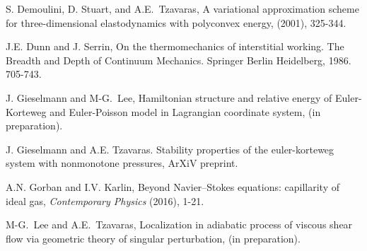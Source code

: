 \documentclass[a4paper,11pt]{article}
\begin{document}
\begin{thebibliography}{10}
S. Demoulini, D. Stuart, and A.E.~Tzavaras,
\newblock A variational approximation scheme for three-dimensional
  elastodynamics with polyconvex energy,
 (2001), 325-344.

J.E. Dunn and J. Serrin, On the thermomechanics of interstitial working. The Breadth and Depth of Continuum Mechanics. Springer Berlin Heidelberg, 1986. 705-743.


{\sc J. Gieselmann and M-G.~Lee},
Hamiltonian structure and relative energy of Euler-Korteweg and Euler-Poisson model in Lagrangian coordinate system, (in preparation).

J. Gieselmann and A.E. Tzavaras.
\newblock Stability properties of the euler-korteweg system
with nonmonotone pressures,
\newblock ArXiV preprint.

A.N. Gorban and I.V. Karlin, Beyond Navier–Stokes equations: capillarity of ideal gas, {\it Contemporary Physics} (2016), 1-21.

{\sc M-G.~Lee and A.E.~Tzavaras},
Localization in adiabatic process of viscous shear flow via geometric theory of singular perturbation, (in preparation).


%




\end{thebibliography}
\end{document}
